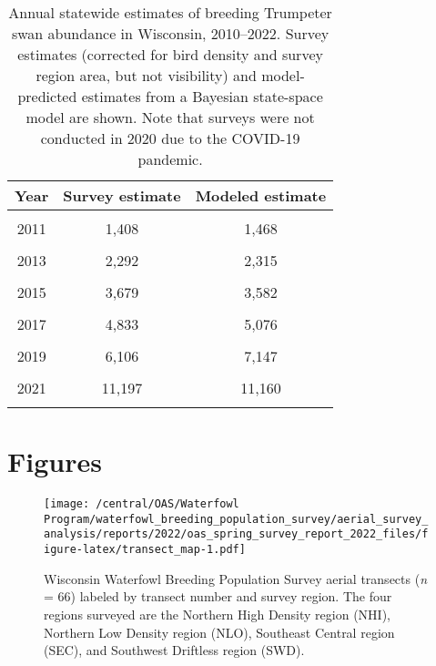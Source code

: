 \documentclass[
  12pt,
]{article}
\begin{document}
\newpage

\begin{table}[!h]

\caption{\label{tab:trump_tab}Annual statewide estimates of breeding Trumpeter swan abundance in Wisconsin, 2010--2022. Survey estimates (corrected for bird density and survey region area, but not visibility) and model-predicted estimates from a Bayesian state-space model are shown. Note that surveys were not conducted in 2020 due to the COVID-19 pandemic.}
\centering
\begin{tabular}[t]{ccc}
\toprule
\textbf{Year} & \textbf{Survey estimate} & \textbf{Modeled estimate}\\
\midrule
\cellcolor{gray!6}{2010} & \cellcolor{gray!6}{1,237} & \cellcolor{gray!6}{1,203}\\
2011 & 1,408 & 1,468\\
\cellcolor{gray!6}{2012} & \cellcolor{gray!6}{1,999} & \cellcolor{gray!6}{1,883}\\
2013 & 2,292 & 2,315\\
\cellcolor{gray!6}{2014} & \cellcolor{gray!6}{2,979} & \cellcolor{gray!6}{2,906}\\
2015 & 3,679 & 3,582\\
\cellcolor{gray!6}{2016} & \cellcolor{gray!6}{5,029} & \cellcolor{gray!6}{4,469}\\
2017 & 4,833 & 5,076\\
\cellcolor{gray!6}{2018} & \cellcolor{gray!6}{5,677} & \cellcolor{gray!6}{6,019}\\
2019 & 6,106 & 7,147\\
\cellcolor{gray!6}{2020} & \cellcolor{gray!6}{} & \cellcolor{gray!6}{9,303}\\
2021 & 11,197 & 11,160\\
\cellcolor{gray!6}{2022} & \cellcolor{gray!6}{11,919} & \cellcolor{gray!6}{13,320}\\
\bottomrule
\end{tabular}
\end{table}

\newpage

\hypertarget{figures}{%
\section{Figures}\label{figures}}

\begin{figure}
\centering
\texttt{[image: /central/OAS/Waterfowl Program/waterfowl\_breeding\_population\_survey/aerial\_survey\_analysis/reports/2022/oas\_spring\_survey\_report\_2022\_files/figure-latex/transect\_map-1.pdf]}
\caption{\label{fig:transect_map}Wisconsin Waterfowl Breeding Population
Survey aerial transects (\emph{n} = 66) labeled by transect number and
survey region. The four regions surveyed are the Northern High Density
region (NHI), Northern Low Density region (NLO), Southeast Central
region (SEC), and Southwest Driftless region (SWD).}
\end{figure}
\end{document}
